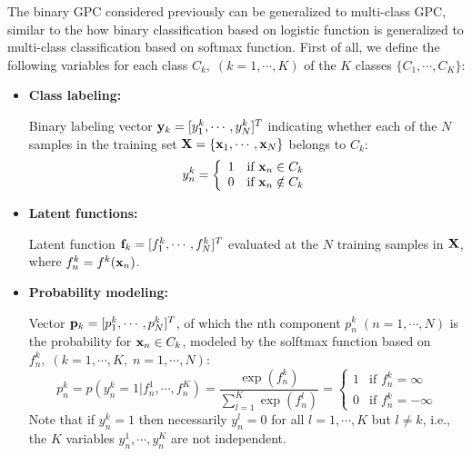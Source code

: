 \documentclass{article}
\begin{document}
The binary GPC considered previously can be generalized to multi-class 
GPC, similar to the how binary classification based on logistic function
is generalized to multi-class classification based on softmax function.
First of all, we define the following variables for each class $C_k,\; 
(k=1,\cdots,K)$ of the $K$ classes $\{C_1,\cdots,C_K\}$:
\begin{itemize}
\item {\bf Class labeling:}

  Binary labeling vector ${\bf y}_k=[y_1^k,\cdots,y_N^k]^T$ 
  indicating whether each of the $N$ samples in the training set 
  ${\bf X}=\{{\bf x}_1,\cdots,{\bf x}_N\}$ belongs to $C_k$:
  \begin{equation}
    y_n^k=\left\{\begin{array}{ll}1 & \mbox{if ${\bf x}_n\in C_k$}\\
    0 & \mbox{if ${\bf x}_n\notin C_k$}\end{array}\right.
  \end{equation}

\item {\bf Latent functions:}

  Latent function ${\bf f}_k=[f_1^k,\cdots,f_N^k]^T$ evaluated at the
  $N$ training samples in ${\bf X}$, where $f_n^k=f^k({\bf x}_n)$.

\item {\bf Probability modeling:}

  Vector ${\bf p}_k=[p_1^k,\cdots,p_N^k]^T$, of which the nth component
  $p_n^k\;(n=1,\cdots,N)$ is the probability for ${\bf x}_n\in C_k$,
  modeled by the solftmax function based on $f_n^k,\;(k=1,\cdots,K,\;
  n=1,\cdots,N)$:
  \begin{equation}
    p_n^k=p(y_n^k=1|f_n^1,\cdots,f_n^K)
    =\frac{\exp(f_n^k)}{\sum_{l=1}^K\exp(f_n^l)}
    =\left\{\begin{array}{ll}1 & \mbox{if $f_n^k=\infty$}\\ 
    0 & \mbox{if $f_n^k=-\infty$}\end{array}\right.
    \label{SoftmaxGPC}
  \end{equation}
  Note that if $y_n^k=1$ then necessarily $y_n^l=0$ for all 
  $l=1,\cdots,K$ but $l\ne k$, i.e., the $K$ variables 
  $y_n^1,\cdots,y_n^K$ are not independent.
\end{itemize}
\end{document}
